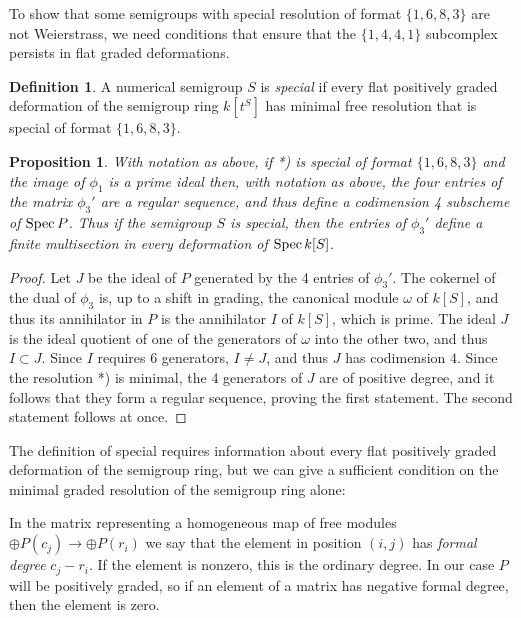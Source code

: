 \documentclass[twoside,12pt, leqno]{amsart}
\newtheorem{proposition}[theorem]{Proposition}
\theoremstyle{definition}
\newtheorem{definition}[theorem]{Definition}
\DeclareMathOperator{\Spec}{{Spec}}
\def\Spec{{{\rm Spec}\,}}
\begin{document}
To show that some semigroups with special resolution
of format $\{1,6,8,3\}$ are not Weierstrass,
we need conditions that ensure that the $\{1,4,4,1\}$ subcomplex  persists
in flat graded deformations.

\begin{definition}\label{special def}
A numerical semigroup $S$ is \emph{special} if every flat positively graded deformation
of the semigroup ring $k[t^{S}]$ has minimal free resolution that is special of format $\{1,6,8,3\}$.
\end{definition}
 
 
\begin{proposition}\label{the multisection}
With notation as above, if *) is special of format $\{1,6,8,3\}$ and the image of $\phi_{1}$
is a prime ideal then, with notation as above, the four
entries of the matrix $\phi_{3}'$ are a regular sequence, and thus define a
codimension 4 subscheme of $\Spec P$.
Thus if the semigroup $S$ is special, then the entries of $\phi_{3}'$ define a finite multisection
 in every deformation of $\Spec k[S]$.
  \end{proposition}
  
\begin{proof} Let $J$ be the ideal of $P$ generated by the 4 entries of $\phi_{3}'$. The cokernel of the dual of $\phi_{3}$ is, up to a shift in grading, the canonical module $\omega$ of 
 $k[S]$, and thus its annihilator in $P$ is the annihilator $I$ of $k[S]$, which is prime. The
 ideal $J$ is the ideal quotient of one of the generators of $\omega$ into the other two,
 and thus $I\subset J$. Since $I$ requires 6 generators, $I\neq J$, and thus $J$ has
 codimension $4$. Since the resolution *) is minimal, the 4 generators of $J$ are of positive
 degree, and it follows that they form a regular sequence, proving the first statement. The second statement follows at once.
\end{proof}
 

 The definition of special requires information about every flat positively graded
 deformation of the semigroup ring, but we can give a sufficient condition on the minimal graded resolution
 of the semigroup ring alone:
 
In the matrix representing a homogeneous map of free modules
$\oplus P(c_{j}) \to \oplus P(r_{i})$  we say that the element in position $(i,j)$
 has \emph{formal degree} $c_j-r_{i}$. If the element is nonzero,
 this is the ordinary degree. In our case $P$ will be 
 positively graded, so if an element of a matrix
has  negative formal degree, then the element is zero.
\end{document}
